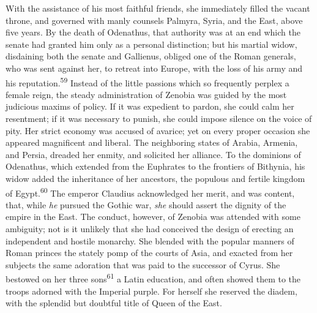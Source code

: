 With the assistance of his most faithful friends, she immediately
filled the vacant throne, and governed with manly counsels
Palmyra, Syria, and the East, above five years. By the death of
Odenathus, that authority was at an end which the senate had
granted him only as a personal distinction; but his martial
widow, disdaining both the senate and Gallienus, obliged one of
the Roman generals, who was sent against her, to retreat into
Europe, with the loss of his army and his reputation.\textsuperscript{59} Instead
of the little passions which so frequently perplex a female
reign, the steady administration of Zenobia was guided by the
most judicious maxims of policy. If it was expedient to pardon,
she could calm her resentment; if it was necessary to punish, she
could impose silence on the voice of pity. Her strict economy was
accused of avarice; yet on every proper occasion she appeared
magnificent and liberal. The neighboring states of Arabia,
Armenia, and Persia, dreaded her enmity, and solicited her
alliance. To the dominions of Odenathus, which extended from the
Euphrates to the frontiers of Bithynia, his widow added the
inheritance of her ancestors, the populous and fertile kingdom of
Egypt.\textsuperscript{60} The emperor Claudius acknowledged her merit, and was
content, that, while \textit{he} pursued the Gothic war, \textit{she} should
assert the dignity of the empire in the East. The conduct,
however, of Zenobia was attended with some ambiguity; not is it
unlikely that she had conceived the design of erecting an
independent and hostile monarchy. She blended with the popular
manners of Roman princes the stately pomp of the courts of Asia,
and exacted from her subjects the same adoration that was paid to
the successor of Cyrus. She bestowed on her three sons\textsuperscript{61} a Latin
education, and often showed them to the troops adorned with the
Imperial purple. For herself she reserved the diadem, with the
splendid but doubtful title of Queen of the East.




